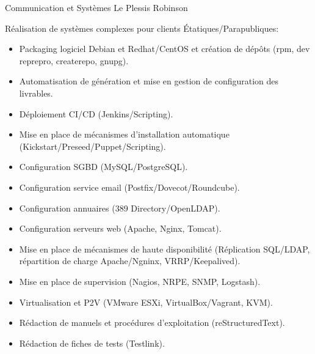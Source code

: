 \documentclass[10pt,a4paper,sans]{moderncv}        %
\begin{document}
        {Communication et Systèmes}
        {Le Plessis Robinson}
        {}
        {Réalisation de systèmes complexes pour clients Étatiques/Parapubliques:
            \begin{itemize}
            \item Packaging logiciel Debian et Redhat/CentOS et création de dépôts (rpm, dev reprepro, createrepo, gnupg).
            \item Automatisation de génération et mise en gestion de configuration des livrables.
            \item Déploiement CI/CD (Jenkins/Scripting).
            \item Mise en place de mécanismes d'installation automatique (Kickstart/Preseed/Puppet/Scripting).
            \item Configuration SGBD (MySQL/PostgreSQL).
            \item Configuration service email (Postfix/Dovecot/Roundcube).
            \item Configuration annuaires (389 Directory/OpenLDAP).
            \item Configuration serveurs web (Apache, Nginx, Tomcat).
            \item Mise en place de mécanismes de haute disponibilité (Réplication SQL/LDAP, répartition de charge Apache/Ngninx, VRRP/Keepalived).
            \item Mise en place de supervision (Nagios, NRPE, SNMP, Logstash).
            \item Virtualisation et P2V (VMware ESXi, VirtualBox/Vagrant, KVM).
            \item Rédaction de manuels et procédures d'exploitation (reStructuredText).
            \item Rédaction de fiches de tests (Testlink).
            \end{itemize}
        }
\end{document}
